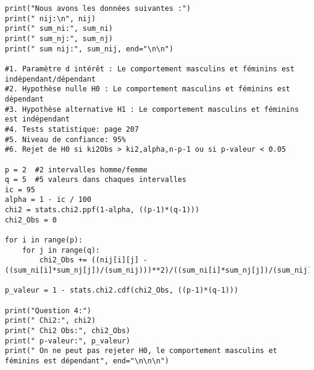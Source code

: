 \begin{lstlisting}[style=myPython, caption=Code Python complet TP5, frame=lines]
print("Nous avons les données suivantes :")
print(" nij:\n", nij)
print(" sum_ni:", sum_ni)
print(" sum_nj:", sum_nj)
print(" sum nij:", sum_nij, end="\n\n")

#1. Paramètre d intérêt : Le comportement masculins et féminins est indépendant/dépendant
#2. Hypothèse nulle H0 : Le comportement masculins et féminins est dépendant
#3. Hypothèse alternative H1 : Le comportement masculins et féminins est indépendant
#4. Tests statistique: page 207
#5. Niveau de confiance: 95%
#6. Rejet de H0 si ki2Obs > ki2,alpha,n-p-1 ou si p-valeur < 0.05

p = 2  #2 intervalles homme/femme
q = 5  #5 valeurs dans chaques intervalles
ic = 95
alpha = 1 - ic / 100
chi2 = stats.chi2.ppf(1-alpha, ((p-1)*(q-1)))
chi2_Obs = 0

for i in range(p):
    for j in range(q):
        chi2_Obs += ((nij[i][j] - ((sum_ni[i]*sum_nj[j])/(sum_nij)))**2)/((sum_ni[i]*sum_nj[j])/(sum_nij))

p_valeur = 1 - stats.chi2.cdf(chi2_Obs, ((p-1)*(q-1)))

print("Question 4:")
print(" Chi2:", chi2)
print(" Chi2 Obs:", chi2_Obs)
print(" p-valeur:", p_valeur)
print(" On ne peut pas rejeter H0, le comportement masculins et féminins est dépendant", end="\n\n\n")
\end{lstlisting}
